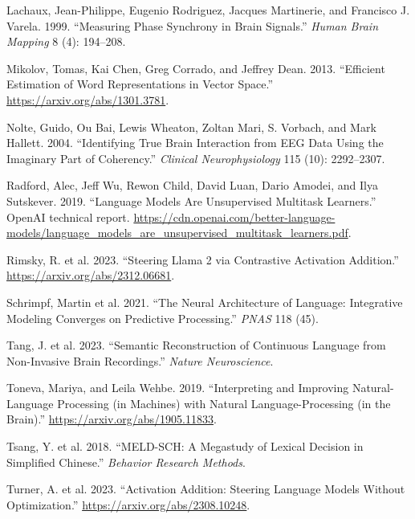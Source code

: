 \documentclass[
]{article}
\newlength{\cslhangindent}
\newenvironment{CSLReferences}[2] %
 {\begin{list}{}{%
  \setlength{\itemindent}{0pt}
  \setlength{\leftmargin}{0pt}
  \setlength{\parsep}{0pt}
  \ifodd #1
   \setlength{\leftmargin}{\cslhangindent}
   \setlength{\itemindent}{-1\cslhangindent}
  \fi
  \setlength{\itemsep}{#2\baselineskip}}}
 {\end{list}}
\begin{document}
\begin{CSLReferences}{1}{0}
Lachaux, Jean-Philippe, Eugenio Rodriguez, Jacques Martinerie, and
Francisco J. Varela. 1999. {``Measuring Phase Synchrony in Brain
Signals.''} \emph{Human Brain Mapping} 8 (4): 194--208.

Mikolov, Tomas, Kai Chen, Greg Corrado, and Jeffrey Dean. 2013.
{``Efficient Estimation of Word Representations in Vector Space.''}
\url{https://arxiv.org/abs/1301.3781}.

Nolte, Guido, Ou Bai, Lewis Wheaton, Zoltan Mari, S. Vorbach, and Mark
Hallett. 2004. {``Identifying True Brain Interaction from EEG Data Using
the Imaginary Part of Coherency.''} \emph{Clinical Neurophysiology} 115
(10): 2292--2307.

Radford, Alec, Jeff Wu, Rewon Child, David Luan, Dario Amodei, and Ilya
Sutskever. 2019. {``Language Models Are Unsupervised Multitask
Learners.''} OpenAI technical report.
\url{https://cdn.openai.com/better-language-models/language_models_are_unsupervised_multitask_learners.pdf}.

Rimsky, R. et al. 2023. {``Steering Llama 2 via Contrastive Activation
Addition.''} \url{https://arxiv.org/abs/2312.06681}.

Schrimpf, Martin et al. 2021. {``The Neural Architecture of Language:
Integrative Modeling Converges on Predictive Processing.''} \emph{PNAS}
118 (45).

Tang, J. et al. 2023. {``Semantic Reconstruction of Continuous Language
from Non-Invasive Brain Recordings.''} \emph{Nature Neuroscience}.

Toneva, Mariya, and Leila Wehbe. 2019. {``Interpreting and Improving
Natural-Language Processing (in Machines) with Natural
Language-Processing (in the Brain).''}
\url{https://arxiv.org/abs/1905.11833}.

Tsang, Y. et al. 2018. {``MELD-SCH: A Megastudy of Lexical Decision in
Simplified Chinese.''} \emph{Behavior Research Methods}.

Turner, A. et al. 2023. {``Activation Addition: Steering Language Models
Without Optimization.''} \url{https://arxiv.org/abs/2308.10248}.


\end{CSLReferences}
\end{document}
